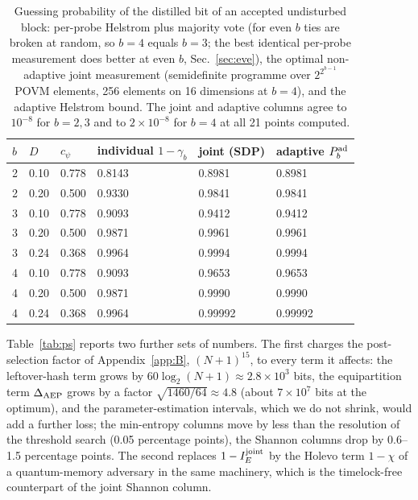 \documentclass[aps,pra,twocolumn,superscriptaddress,nofootinbib]{revtex4-2}
\begin{document}
\begin{table}[t]\centering\caption{Guessing probability of the distilled bit of an accepted undisturbed block: per-probe Helstrom plus majority vote (for even $b$ ties are broken at random, so $b=4$ equals $b=3$; the best identical per-probe measurement does better at even $b$, Sec.~\ref{sec:eve}), the optimal non-adaptive joint measurement (semidefinite programme over $2^{2^{b-1}}$ POVM elements, 256 elements on 16 dimensions at $b=4$), and the adaptive Helstrom bound. The joint and adaptive columns agree to $10^{-8}$ for $b=2,3$ and to $2\times10^{-8}$ for $b=4$ at all 21 points computed.}\label{tab:sdp}
\begin{tabular}{llllll}\toprule
$b$ & $D$ & $c_\psi$ & individual $1-\gamma_b$ & joint (SDP) & adaptive $P^{\rm ad}_b$\\\midrule
2 & 0.10 & 0.778 & 0.8143 & 0.8981 & 0.8981\\
2 & 0.20 & 0.500 & 0.9330 & 0.9841 & 0.9841\\
3 & 0.10 & 0.778 & 0.9093 & 0.9412 & 0.9412\\
3 & 0.20 & 0.500 & 0.9871 & 0.9961 & 0.9961\\
3 & 0.24 & 0.368 & 0.9964 & 0.9994 & 0.9994\\
4 & 0.10 & 0.778 & 0.9093 & 0.9653 & 0.9653\\
4 & 0.20 & 0.500 & 0.9871 & 0.9990 & 0.9990\\
4 & 0.24 & 0.368 & 0.9964 & 0.99992 & 0.99992\\\bottomrule\end{tabular}\end{table}
Table~\ref{tab:ps} reports two further sets of numbers. The first charges the post-selection factor of Appendix~\ref{app:B}, $(N+1)^{15}$, to every term it affects: the leftover-hash term grows by $60\log_2(N+1)\approx2.8\times10^3$ bits, the equipartition term $\Delta_{\rm AEP}$ grows by a factor $\sqrt{1460/64}\approx4.8$ (about $7\times10^7$ bits at the optimum), and the parameter-estimation intervals, which we do not shrink, would add a further loss; the min-entropy columns move by less than the resolution of the threshold search (0.05 percentage points), the Shannon columns drop by 0.6--1.5 percentage points. The second replaces $1-I_E^{\rm joint}$ by the Holevo term $1-\chi$ of a quantum-memory adversary in the same machinery, which is the timelock-free counterpart of the joint Shannon column.
\end{document}
